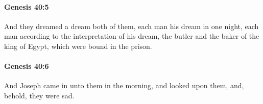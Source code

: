 		\paragraph{Genesis 40:5} %
			\label{GENESIS-40-5}

			And they dreamed a dream both of them, each man his dream in one night, each man according to the interpretation of his dream, the butler and the baker of the king of Egypt, which were bound in the prison.


		\paragraph{Genesis 40:6} %
			\label{GENESIS-40-6}

			And Joseph came in unto them in the morning, and looked upon them, and, behold, they were sad.


